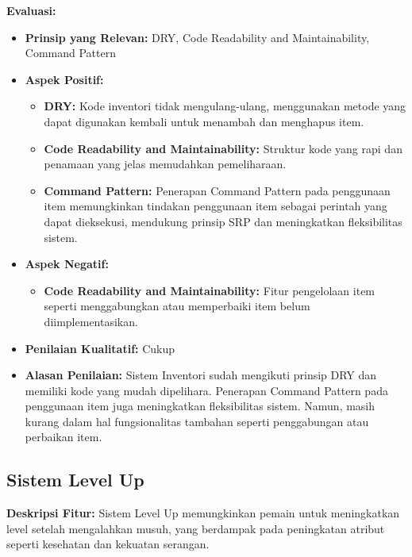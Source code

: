 \documentclass[12pt]{article}
\begin{document}
\textbf{Evaluasi:}
\begin{itemize}
    \item \textbf{Prinsip yang Relevan:} DRY, Code Readability and Maintainability, Command Pattern
    \item \textbf{Aspek Positif:}
    \begin{itemize}
        \item \textbf{DRY:} Kode inventori tidak mengulang-ulang, menggunakan metode yang dapat digunakan kembali untuk menambah dan menghapus item.
        \item \textbf{Code Readability and Maintainability:} Struktur kode yang rapi dan penamaan yang jelas memudahkan pemeliharaan.
        \item \textbf{Command Pattern:} Penerapan Command Pattern pada penggunaan item memungkinkan tindakan penggunaan item sebagai perintah yang dapat dieksekusi, mendukung prinsip SRP dan meningkatkan fleksibilitas sistem.
    \end{itemize}
    \item \textbf{Aspek Negatif:}
    \begin{itemize}
        \item \textbf{Code Readability and Maintainability:} Fitur pengelolaan item seperti menggabungkan atau memperbaiki item belum diimplementasikan.
    \end{itemize}
    \item \textbf{Penilaian Kualitatif:} Cukup
    \item \textbf{Alasan Penilaian:} Sistem Inventori sudah mengikuti prinsip DRY dan memiliki kode yang mudah dipelihara. Penerapan Command Pattern pada penggunaan item juga meningkatkan fleksibilitas sistem. Namun, masih kurang dalam hal fungsionalitas tambahan seperti penggabungan atau perbaikan item.
\end{itemize}

\subsection{Sistem Level Up}
\textbf{Deskripsi Fitur:} Sistem Level Up memungkinkan pemain untuk meningkatkan level setelah mengalahkan musuh, yang berdampak pada peningkatan atribut seperti kesehatan dan kekuatan serangan.
\end{document}
